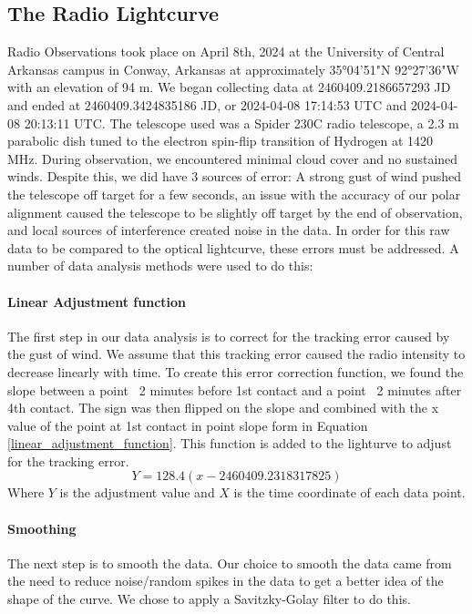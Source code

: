 \subsection{\label{sec:radio}The Radio Lightcurve}
Radio Observations took place on April 8th, 2024 at the University of Central Arkansas campus in Conway, Arkansas at approximately 35°04'51"N 92°27'36"W with an elevation of 94 m.
We began collecting data at 2460409.2186657293 JD and ended at 2460409.3424835186 JD, or 2024-04-08 17:14:53 UTC and 2024-04-08 20:13:11 UTC.
The telescope used was a Spider 230C radio telescope, a 2.3 m parabolic dish tuned to the electron spin-flip transition of Hydrogen at 1420 MHz.
During observation, we encountered minimal cloud cover and no sustained winds.
Despite this, we did have 3 sources of error: A strong gust of wind pushed the telescope off target for a few seconds, an issue with the accuracy of our polar alignment caused the telescope to be slightly off target by the end of observation, and local sources of interference created noise in the data.
In order for this raw data to be compared to the optical lightcurve, these errors must be addressed.
A number of data analysis methods were used to do this:
\paragraph{Linear Adjustment function}
The first step in our data analysis is to correct for the tracking error caused by the gust of wind.
We assume that this tracking error caused the radio intensity to decrease linearly with time.
To create this error correction function, we found the slope between a point ~2 minutes before 1st contact and a point ~2 minutes after 4th contact. 
The sign was then flipped on the slope and combined with the x value of the point at 1st contact in point slope form in Equation \ref{linear_adjustment_function}.
This function is added to the lighturve to adjust for the tracking error.
\begin{equation}\label{linear_adjustment_function}
Y = 128.4(x-2460409.2318317825)
\end{equation}
Where $Y$ is the adjustment value and $X$ is the time coordinate of each data point. 
\paragraph{Smoothing}
The next step is to smooth the data.
Our choice to smooth the data came from the need to reduce noise/random spikes in the data to get a better idea of the shape of the curve.
We chose to apply a Savitzky-Golay filter to do this.
